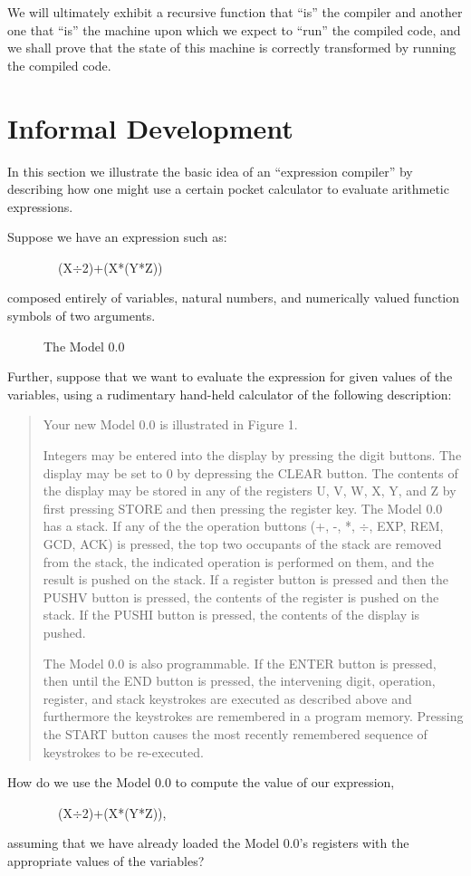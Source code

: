 \documentclass[11pt]{book}
\newenvironment{pubasis}{\begin{flushleft}\ttfamily\small}{\normalsize\rmfamily\end{flushleft}}
\newenvironment{pubcrown}{\begin{quote}}{\end{quote}}
\newcommand{\pubdefaulttextsize}{\large}
\begin{document}
We will ultimately exhibit a recursive function
that ``is'' the compiler and another one that ``is'' the machine upon which we
expect to ``run'' the compiled code, and we shall prove that the state of
this machine is correctly transformed by running the compiled code.
\section{Informal Development}
\pubdefaulttextsize
In this section we illustrate the basic idea of an ``expression
compiler'' by describing how one might use a certain
pocket calculator to evaluate arithmetic expressions.

Suppose we have an expression such as:
\begin{pubasis}
~~~~~~~~(X$\div$2)+(X*(Y*Z))\\
\end{pubasis}
composed entirely of variables, natural numbers, and numerically valued
function symbols of two arguments.
\begin{figure}
\vspace{50\baselineskip}
\caption{The Model 0.0}
\end{figure}
Further, suppose that we want to evaluate the expression for given values of
the variables, using a rudimentary hand-held calculator of the
following description:
\begin{pubcrown}
Your new Model 0.0 is illustrated in Figure 1.

Integers may be entered into the display
by pressing the digit buttons.  The display may be set to 0 by
depressing the CLEAR button.  The contents of the display may
be stored in any of the registers U, V, W, X, Y, and Z
by first pressing STORE and then pressing the register key.
The Model 0.0 has a stack.  If any of the the operation
buttons (+, -, *, $\div$, EXP, REM, GCD, ACK) is pressed,
the top two occupants of the stack are removed from the stack,
the indicated operation is performed on them, and the result
is pushed on the stack.  If a register button is pressed and
then the PUSHV button is pressed, the contents of the
register is pushed on the stack.  If the PUSHI button is
pressed, the contents of the display is pushed.

The Model 0.0 is also programmable.  If the ENTER button is pressed,
then until the END button is pressed, the intervening
digit, operation, register, and stack keystrokes
are executed as described above and furthermore
the keystrokes are remembered in a program memory.
Pressing the START button causes the most recently
remembered sequence of keystrokes to be 
re-executed.
\end{pubcrown}
How do we use the Model 0.0 to compute the value of our expression,
\begin{pubasis}
~~~~~~~~(X$\div$2)+(X*(Y*Z)),\\
\end{pubasis}
assuming that we have already loaded the Model 0.0's registers
with the appropriate values of the variables?
\end{document}
